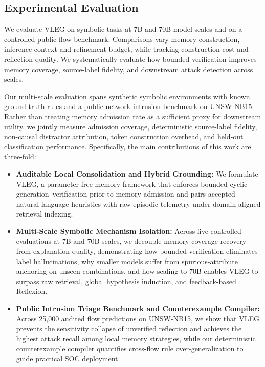\documentclass[journal]{IEEEtran}
\theoremstyle{definition}
\theoremstyle{remark}
\begin{document}
\subsection{Experimental Evaluation}
We evaluate VLEG on symbolic tasks at 7B and 70B model scales and on a controlled public-flow benchmark. Comparisons vary memory construction, inference context and refinement budget, while tracking construction cost and reflection quality. We systematically evaluate how bounded verification improves memory coverage, source-label fidelity, and downstream attack detection across scales.

Our multi-scale evaluation spans synthetic symbolic environments with known ground-truth rules and a public network intrusion benchmark on UNSW-NB15. Rather than treating memory admission rate as a sufficient proxy for downstream utility, we jointly measure admission coverage, deterministic source-label fidelity, non-causal distractor attribution, token construction overhead, and held-out classification performance. Specifically, the main contributions of this work are three-fold:
\begin{itemize}
    \item \textbf{Auditable Local Consolidation and Hybrid Grounding:} We formulate VLEG, a parameter-free memory framework that enforces bounded cyclic generation--verification prior to memory admission and pairs accepted natural-language heuristics with raw episodic telemetry under domain-aligned retrieval indexing.
    \item \textbf{Multi-Scale Symbolic Mechanism Isolation:} Across five controlled evaluations at 7B and 70B scales, we decouple memory coverage recovery from explanation quality, demonstrating how bounded verification eliminates label hallucinations, why smaller models suffer from spurious-attribute anchoring on unseen combinations, and how scaling to 70B enables VLEG to surpass raw retrieval, global hypothesis induction, and feedback-based Reflexion.
    \item \textbf{Public Intrusion Triage Benchmark and Counterexample Compiler:} Across 25,000 audited flow predictions on UNSW-NB15, we show that VLEG prevents the sensitivity collapse of unverified reflection and achieves the highest attack recall among local memory strategies, while our deterministic counterexample compiler quantifies cross-flow rule over-generalization to guide practical SOC deployment.
\end{itemize}
\end{document}
